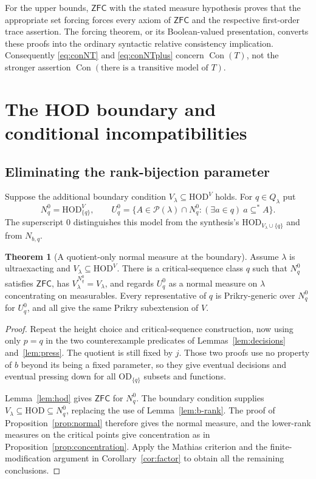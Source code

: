 \documentclass[11pt,letterpaper]{article}
\theoremstyle{definition}
\newtheorem{theorem}[definition]{Theorem}
\numberwithin{equation}{section}
\newcommand{\ZFC}{\mathsf{ZFC}}
\newcommand{\HOD}{\mathrm{HOD}}
\newcommand{\OD}{\mathrm{OD}}
\newcommand{\Con}{\operatorname{Con}}
\newcommand{\Pow}{\mathcal P}
\begin{document}
For the upper bounds, $\ZFC$ with the stated measure hypothesis proves
that the appropriate set forcing forces every axiom of $\ZFC$ and the
respective first-order trace assertion. The forcing theorem, or its
Boolean-valued presentation, converts these proofs into the ordinary
syntactic relative consistency implication. Consequently
\eqref{eq:conNT} and \eqref{eq:conNTplus} concern $\Con(T)$, not the
stronger assertion $\Con(\text{there is a transitive model of }T)$.

\section{The HOD boundary and conditional incompatibilities}\label{sec:boundary}

\subsection{Eliminating the rank-bijection parameter}

Suppose the additional boundary condition $V_\lambda\subseteq\HOD^V$
holds. For $q\in Q_\lambda$ put
\[
 N_q^0=\HOD_{\{q\}}^V,\qquad
 U_q^0=\{A\in\Pow(\lambda)\cap N_q^0:
                      (\exists a\in q)\ a\subseteq^* A\}.
\]
The superscript $0$ distinguishes this model from the synthesis's
$\HOD_{V_\lambda\cup\{q\}}$ and from $N_{b,q}$.

\begin{theorem}[A quotient-only normal measure at the boundary]\label{thm:boundary}
Assume $\lambda$ is ultraexacting and $V_\lambda\subseteq\HOD^V$.
There is a critical-sequence class $q$ such that $N_q^0$ satisfies
$\ZFC$, has $V_\lambda^{N_q^0}=V_\lambda$, and regards $U_q^0$ as a
normal measure on $\lambda$ concentrating on measurables. Every
representative of $q$ is Prikry-generic over $N_q^0$ for $U_q^0$, and
all give the same Prikry subextension of $V$.
\end{theorem}

\begin{proof}
Repeat the height choice and critical-sequence construction, now using
only $p=q$ in the two counterexample predicates of
Lemmas~\ref{lem:decisions} and~\ref{lem:press}. The quotient is still
fixed by $j$. Those two proofs use no property of $b$ beyond its being
a fixed parameter, so they give eventual decisions and eventual
pressing down for all $\OD_{\{q\}}$ subsets and functions.

Lemma~\ref{lem:hod} gives $\ZFC$ for $N_q^0$. The boundary condition
supplies $V_\lambda\subseteq\HOD\subseteq N_q^0$, replacing the use
of Lemma~\ref{lem:b-rank}. The proof of Proposition~\ref{prop:normal}
therefore gives the normal measure, and the lower-rank measures on the
critical points give concentration as in
Proposition~\ref{prop:concentration}. Apply the Mathias criterion and
the finite-modification argument in Corollary~\ref{cor:factor} to
obtain all the remaining conclusions.
\end{proof}
\end{document}
